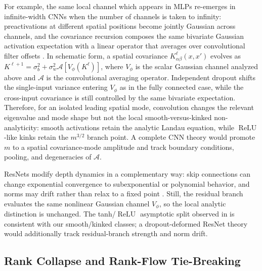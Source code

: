 \documentclass{article}
\DeclareMathOperator{\ReLU}{ReLU}
\newcommand{\relu}{\ensuremath{\ReLU}}
\theoremstyle{plain}
\theoremstyle{definition}
\theoremstyle{remark}
\begin{document}
For example, the same local channel which appears in MLPs re-emerges in infinite-width CNNs when the number of channels is taken to infinity: preactivations at different spatial positions become jointly Gaussian across channels, and the covariance recursion composes the same bivariate Gaussian activation expectation with a linear operator that averages over convolutional filter offsets \cite{cnnslecun,xiao2018dynamicalisometrymeanfield}. In schematic form, a spatial covariance \(K^\ell_{\alpha\beta}(x,x')\) evolves as \(K^{\ell+1}=\sigma_b^2+\sigma_w^2\mathcal A[V_\phi(K^\ell)]\), where \(V_\phi\) is the scalar Gaussian channel analyzed above and \(\mathcal A\) is the convolutional averaging operator. Independent dropout shifts the single-input variance entering \(V_\phi\) as in the fully connected case, while the cross-input covariance is still controlled by the same bivariate expectation. Therefore, for an isolated leading spatial mode, convolution changes the relevant eigenvalue and mode shape but not the local smooth-versus-kinked non-analyticity: smooth activations retain the analytic Landau equation, while \relu{}-like kinks retain the \(m^{3/2}\) branch point. A complete CNN theory would promote \(m\) to a spatial covariance-mode amplitude and track boundary conditions, pooling, and degeneracies of \(\mathcal A\).

ResNets modify depth dynamics in a complementary way: skip connections can change exponential convergence to subexponential or polynomial behavior, and norms may drift rather than relax to a fixed point \cite{yang2017meanfieldresnets}. Still, the residual branch evaluates the same nonlinear Gaussian channel \(V_\phi\), so the local analytic distinction is unchanged. The tanh/\relu{} asymptotic split observed in \cite{yang2017meanfieldresnets} is consistent with our smooth/kinked classes; a dropout-deformed ResNet theory would additionally track residual-branch strength and norm drift.

\FloatBarrier










\subsection{Rank Collapse and Rank-Flow Tie-Breaking}
\label{app:rank_flow}
\end{document}
